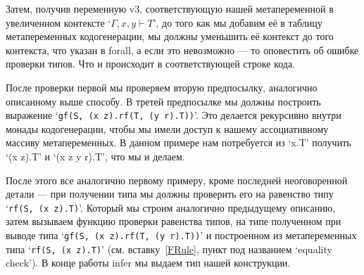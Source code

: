Затем, получив переменную v3, соответствующую нашей метапеременной в увеличенном контексте `$\Gamma, x, y \vdash T$', до того как мы добавим её в таблицу метапеременных кодогенерации, мы должны уменьшить её контекст до того контекста, что указан в forall, а если это невозможно --- то оповестить об ошибке проверки типов. Что и происходит в соответствующей строке кода.

После проверки первой мы проверяем вторую предпосылку, аналогично описанному выше способу. В третей предпосылке мы должны построить выражение `\lstinline{gf(S, (x z).rf(T, (y r).T))}'. Это делается рекурсивно внутри монады кодогенерации, чтобы мы имели доступ к нашему ассоциативному массиву метапеременных. В данном примере нам потребуется из `x.T' получить `(x z).T' и `(x z y r).T', что мы и делаем.

После этого все аналогично первому примеру, кроме последней неоговоренной детали --- при получении типа мы должны проверить его на равенство типу  `\lstinline{rf(S, (x z).T)}'. Который мы строим аналогично предыдущему описанию, затем вызываем функцию проверки равенства типов, на типе полученном при выводе типа `\lstinline{gf(S, (x z).rf(T, (y r).T))}' и построенном из метапеременных типа `\lstinline{rf(S, (x z).T)}' (см. вставку~\ref{FRule}, пункт под названием `equality check'). В конце работы infer мы выдаем тип нашей конструкции.

